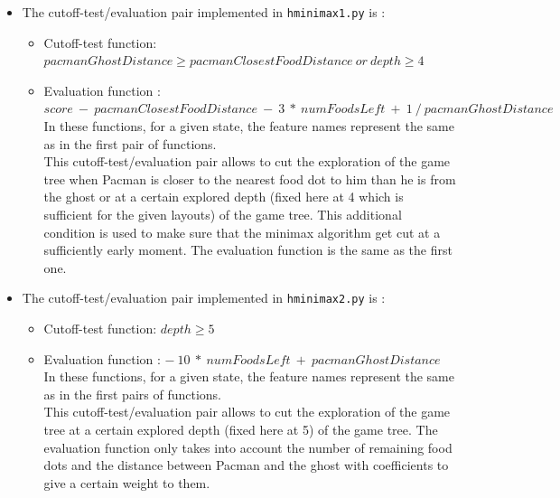\documentclass{article}
\begin{document}
\begin{enumerate}[label=\alph*.,leftmargin=*]
\begin{itemize}
			\item The cutoff-test/evaluation pair implemented in \texttt{hminimax1.py} is :
				\begin{itemize}
					\item Cutoff-test function: $pacmanGhostDistance \geq pacmanClosestFoodDistance \ or \ depth \geq 4$
					\item Evaluation function : $score \ - \ pacmanClosestFoodDistance \ - \ 3 \ * \ numFoodsLeft \ + \ 1 \ / \ pacmanGhostDistance$\\
				
					In these functions, for a given state, the feature names represent the same as in the first pair of functions.\\
				
					This cutoff-test/evaluation pair allows to cut the exploration of the game tree when Pacman is closer to the nearest food dot to him than he is from the ghost or at a certain explored depth (fixed here at 4 which is sufficient for the given layouts) of the game tree. This additional condition is used to make sure that the minimax algorithm get cut at a sufficiently early moment. The evaluation function is the same as the first one.\\
				\end{itemize}

			\item The cutoff-test/evaluation pair implemented in \texttt{hminimax2.py} is :
				\begin{itemize}
					\item Cutoff-test function: $depth \geq 5$
					\item Evaluation function : $- \ 10 \ * \ numFoodsLeft \ + \ pacmanGhostDistance$\\
				
					In these functions, for a given state, the feature names represent the same as in the first pairs of functions.\\
				
					This cutoff-test/evaluation pair allows to cut the exploration of the game tree at a certain explored depth (fixed here at 5) of the game tree. The evaluation function only takes into account the number of remaining food dots and the distance between Pacman and the ghost with coefficients to give a certain weight to them.\\
				\end{itemize}
		\end{itemize}
\end{enumerate}
\end{document}
